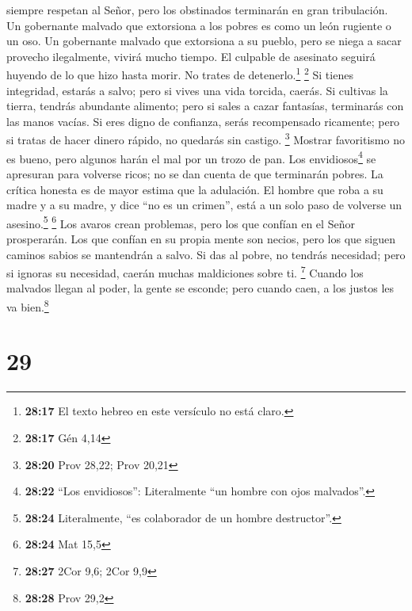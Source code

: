 siempre respetan al Señor, pero los obstinados terminarán en gran
tribulación.  Un gobernante malvado que extorsiona a los
pobres es como un león rugiente o un oso.  Un gobernante
malvado que extorsiona a su pueblo, pero se niega a sacar provecho
ilegalmente, vivirá mucho tiempo.  El culpable de
asesinato seguirá huyendo de lo que hizo hasta morir. No trates de
detenerlo.\footnote{\textbf{28:17} El texto hebreo en este versículo no
  está claro.} \footnote{\textbf{28:17} Gén 4,14}  Si
tienes integridad, estarás a salvo; pero si vives una vida torcida,
caerás.  Si cultivas la tierra, tendrás abundante
alimento; pero si sales a cazar fantasías, terminarás con las manos
vacías.  Si eres digno de confianza, serás recompensado
ricamente; pero si tratas de hacer dinero rápido, no quedarás sin
castigo. \footnote{\textbf{28:20} Prov 28,22; Prov 20,21}
 Mostrar favoritismo no es bueno, pero algunos harán el
mal por un trozo de pan.  Los envidiosos\footnote{\textbf{28:22}
  ``Los envidiosos'': Literalmente ``un hombre con ojos malvados''.} se
apresuran para volverse ricos; no se dan cuenta de que terminarán
pobres.  La crítica honesta es de mayor estima que la
adulación.  El hombre que roba a su madre y a su madre, y
dice ``no es un crimen'', está a un solo paso de volverse un
asesino.\footnote{\textbf{28:24} Literalmente, ``es colaborador de un
  hombre destructor''.} \footnote{\textbf{28:24} Mat 15,5}
 Los avaros crean problemas, pero los que confían en el
Señor prosperarán.  Los que confían en su propia mente
son necios, pero los que siguen caminos sabios se mantendrán a salvo.
 Si das al pobre, no tendrás necesidad; pero si ignoras
su necesidad, caerán muchas maldiciones sobre ti. \footnote{\textbf{28:27}
  2Cor 9,6; 2Cor 9,9}  Cuando los malvados llegan al
poder, la gente se esconde; pero cuando caen, a los justos les va
bien.\footnote{\textbf{28:28} Prov 29,2}

\hypertarget{section-28}{%
\section{29}\label{section-28}}

